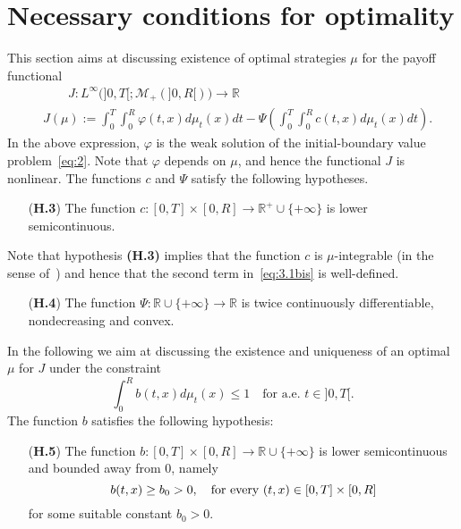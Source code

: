 \documentclass[11pt,leqno]{amsart}
\numberwithin{equation}{section}
\begin{document}
\section{Necessary conditions for optimality}
\label{sec:4}
This section aims at discussing existence of optimal strategies $\mu$ 
for the payoff functional 
\begin{equation}
  \label{eq:3.1bis}
  \begin{split}
    & \qquad J : L^\infty
    \big(]0, T[; \mathcal M_+ (]0, R[) \big) \to {\mathbb{R}}
    \\
    & J(\mu):=\int_0^T \! \! \! \int_0^R {\varphi}(t,x) d\mu_t(x)dt-
    \Psi\left(\int_0^T \! \! \! \int_0^R c(t,x)d\mu_t(x)dt\right).
  \end{split}
\end{equation}
In the above expression, ${\varphi}$ is the weak solution of the initial-boundary value problem~\eqref{eq:2}. Note that ${\varphi}$ depends on $\mu$, and hence the functional $J$ is nonlinear. The functions $c$ and $\Psi$ satisfy the following hypotheses. 
\begin{itemize}
\item[({\bf H.3})] \label{h:acca3} The function $c: [0, T] \times [0, R]
\to {\mathbb{R}}^+ \cup \{+ \infty \}$ is lower semicontinuous. 
\end{itemize}
Note that hypothesis {\bf (H.3)} implies that the function $c$ is $\mu$-integrable (in the sense of~\cite[p.8]{AmbrosioFuscoPallara}) and hence that the second term in~\eqref{eq:3.1bis} is well-defined. 
\begin{itemize}
\item[({\bf H.4})] \label{h:accaquattro} The function
  $\Psi: {\mathbb{R}} \cup\{+\infty\} \to {\mathbb{R}}$ is twice
  continuously differentiable, nondecreasing and convex. \\
\end{itemize}
In the following we aim at discussing the existence and uniqueness of an optimal $\mu$ for $J$ under the constraint 
\begin{equation}
\label{eq:3.2}
\int_0^R b(t,x)  d\mu_t(x) \leq  1 \quad \text{for a.e. $t \in ]0, T[$}. 
\end{equation}
The function $b$ satisfies the following hypothesis: 
\begin{itemize}
\item[({\bf H.5})] 
\label{h:acca5}
The function $b: [0, T] \times [0, R]
\to {\mathbb{R}} \cup \{+ \infty \}$ is lower semicontinuous and bounded away from $0$, namely
\begin{equation}
\label{eq:3.3}
b(t,x)\ge b_0>0, \quad \hbox{for every~} (t,x) \in [0,T]\times[0,R]
\end{equation}
for some suitable constant $b_0 >0$. 
\end{itemize}
\end{document}
